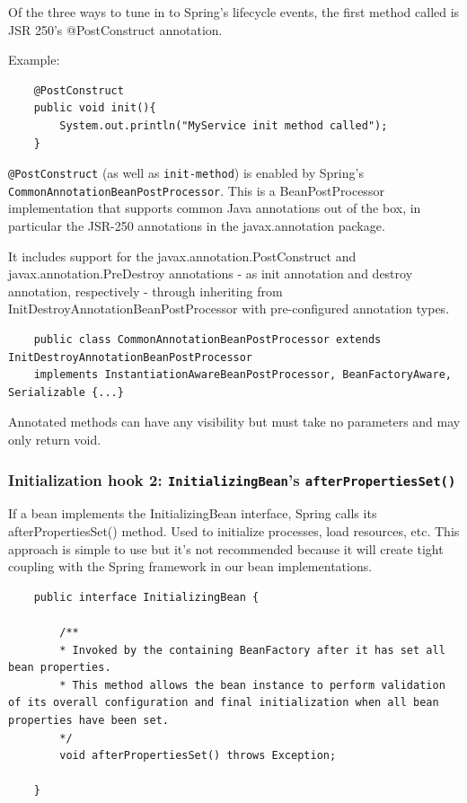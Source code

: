 \documentclass{scrartcl}
\begin{document}
Of the three ways to tune in to Spring's lifecycle events, the first method called is JSR 250's @PostConstruct annotation.

Example:

\begin{lstlisting}
    @PostConstruct
    public void init(){
        System.out.println("MyService init method called");
    }
\end{lstlisting}

\lstinline|@PostConstruct| (as well as \lstinline|init-method|) is enabled by Spring's  \lstinline|CommonAnnotationBeanPostProcessor|. This is a
BeanPostProcessor implementation that supports common Java annotations out of the box, in particular the JSR-250 annotations in the javax.annotation package.

It includes support for the javax.annotation.PostConstruct and javax.annotation.PreDestroy annotations - as init annotation and destroy annotation, respectively - through inheriting from InitDestroyAnnotationBeanPostProcessor with pre-configured annotation types.

\begin{lstlisting}
    public class CommonAnnotationBeanPostProcessor extends InitDestroyAnnotationBeanPostProcessor
    implements InstantiationAwareBeanPostProcessor, BeanFactoryAware, Serializable {...}

\end{lstlisting}

 Annotated methods can have any visibility but must take no parameters and may only return void.

\subsubsection{Initialization hook 2: \lstinline|InitializingBean|’s \lstinline|afterPropertiesSet()|}
If a bean implements the InitializingBean interface, Spring calls its afterPropertiesSet() method. Used to initialize processes,  load resources, etc. This approach is simple to use but it’s not recommended because it will create tight coupling with the Spring framework in our bean implementations.

\begin{lstlisting}
    public interface InitializingBean {

        /**
        * Invoked by the containing BeanFactory after it has set all bean properties.
        * This method allows the bean instance to perform validation of its overall configuration and final initialization when all bean properties have been set.
        */
        void afterPropertiesSet() throws Exception;

    }
\end{lstlisting}
\end{document}
